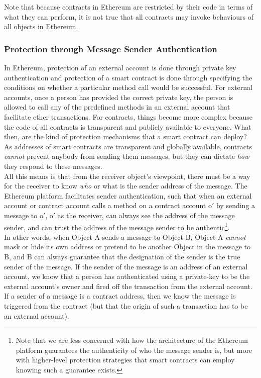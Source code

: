 \documentclass[a4paper,11pt,twoside]{article}
\begin{document}
{Note that because contracts in Ethereum are restricted by their code in terms of what they can perform, it is not true that all contracts may invoke behaviours of all objects in Ethereum.
\subsubsection{Protection through Message Sender Authentication}
In Ethereum, protection of an external account is done through private key authentication and protection of a smart contract is done through specifying the conditions on whether a particular method call would be successful. For external accounts, once a person has provided the correct private key, the person is allowed to call any of the predefined methods in an external account that facilitate ether transactions. For contracts, things become more complex because the code of all contracts is transparent and publicly available to everyone. What then, are the kind of protection mechanisms that a smart contract can deploy? As addresses of smart contracts are transparent and globally available, contracts \textit{cannot} prevent anybody from sending them messages, but they can dictate \textit{how} they respond to these messages.\\

All this means is that from the receiver object's viewpoint, there must be a way for the receiver to know \textit{who} or what is the sender address of the message. The Ethereum platform facilitates sender authentication, such that when an external account or contract account calls a method on a contract account o$'$ by sending a message to o$'$, o$'$ as the receiver, can always see the address of the message sender, and can trust the address of the message sender to be authentic\footnote{Note that we are less concerned with how the architecture of the Ethereum platform guarantees the authenticity of who the message sender is, but more with higher-level protection strategies that smart contracts can employ knowing such a guarantee exists.}.\\

In other words, when Object A sends a message to Object B, Object A \textit{cannot} mask or hide its own address or pretend to be another Object in the message to B, and B can always guarantee that the designation of the sender is the true sender of the message. If the sender of the message is an address of an external account, we know that a person has authenticated using a private-key to be the external account's owner and fired off the transaction from the external account. If a sender of a message is a contract address, then we know the message is triggered from the contract (but that the origin of such a transaction has to be an external account).\\

}
\end{document}
